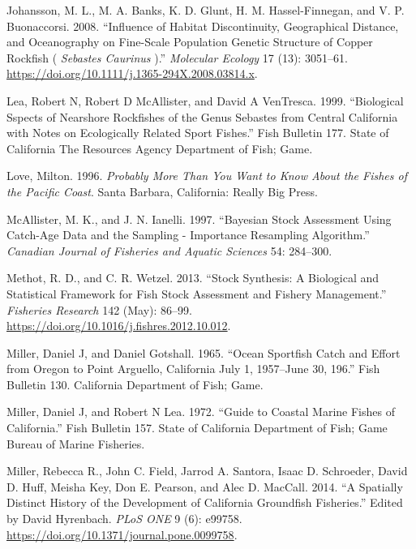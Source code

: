 \documentclass[11pt,
  english,
  a4paper,
]{article}
\begin{document}
\begin{cslreferences}
\leavevmode\hypertarget{ref-johansson_influence_2008}{}%
Johansson, M. L., M. A. Banks, K. D. Glunt, H. M. Hassel-Finnegan, and V. P. Buonaccorsi. 2008. ``Influence of Habitat Discontinuity, Geographical Distance, and Oceanography on Fine-Scale Population Genetic Structure of Copper Rockfish ( \emph{Sebastes Caurinus} ).'' \emph{Molecular Ecology} 17 (13): 3051--61. \url{https://doi.org/10.1111/j.1365-294X.2008.03814.x}.

\leavevmode\hypertarget{ref-lea_biological_1999}{}%
Lea, Robert N, Robert D McAllister, and David A VenTresca. 1999. ``Biological Sspects of Nearshore Rockfishes of the Genus Sebastes from Central California with Notes on Ecologically Related Sport Fishes.'' Fish Bulletin 177. State of California The Resources Agency Department of Fish; Game.

\leavevmode\hypertarget{ref-love_milton_probably_1996}{}%
Love, Milton. 1996. \emph{Probably More Than You Want to Know About the Fishes of the Pacific Coast}. Santa Barbara, California: Really Big Press.

\leavevmode\hypertarget{ref-mcallister_bayesian_1997}{}%
McAllister, M. K., and J. N. Ianelli. 1997. ``Bayesian Stock Assessment Using Catch-Age Data and the Sampling - Importance Resampling Algorithm.'' \emph{Canadian Journal of Fisheries and Aquatic Sciences} 54: 284--300.

\leavevmode\hypertarget{ref-methot_stock_2013}{}%
Methot, R. D., and C. R. Wetzel. 2013. ``Stock Synthesis: A Biological and Statistical Framework for Fish Stock Assessment and Fishery Management.'' \emph{Fisheries Research} 142 (May): 86--99. \url{https://doi.org/10.1016/j.fishres.2012.10.012}.

\leavevmode\hypertarget{ref-miller_ocean_1965}{}%
Miller, Daniel J, and Daniel Gotshall. 1965. ``Ocean Sportfish Catch and Effort from Oregon to Point Arguello, California July 1, 1957--June 30, 196.'' Fish Bulletin 130. California Department of Fish; Game.

\leavevmode\hypertarget{ref-miller_guide_1972}{}%
Miller, Daniel J, and Robert N Lea. 1972. ``Guide to Coastal Marine Fishes of California.'' Fish Bulletin 157. State of California Department of Fish; Game Bureau of Marine Fisheries.

\leavevmode\hypertarget{ref-miller_spatially_2014}{}%
Miller, Rebecca R., John C. Field, Jarrod A. Santora, Isaac D. Schroeder, David D. Huff, Meisha Key, Don E. Pearson, and Alec D. MacCall. 2014. ``A Spatially Distinct History of the Development of California Groundfish Fisheries.'' Edited by David Hyrenbach. \emph{PLoS ONE} 9 (6): e99758. \url{https://doi.org/10.1371/journal.pone.0099758}.


\end{cslreferences}
\end{document}
